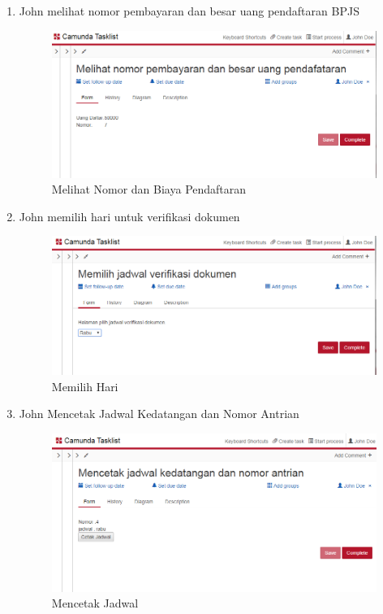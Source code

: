 \begin{enumerate}
	\item John melihat nomor pembayaran dan besar uang pendaftaran BPJS
	\begin{figure}[H]
			\centering
			\includegraphics[scale=0.6]{Gambar/Bab-3/BPMS/Kasus2/3}
			\caption{Melihat Nomor dan Biaya Pendaftaran} 
			\label{fig:otomasi_kasus2_3}
	\end{figure}
	
	\item John memilih hari untuk verifikasi dokumen
	\begin{figure}[H]
			\centering
			\includegraphics[scale=0.6]{Gambar/Bab-3/BPMS/Kasus2/4}
			\caption{Memilih Hari} 
			\label{fig:otomasi_kasus2_4}
	\end{figure}
	
	\item John Mencetak Jadwal Kedatangan dan Nomor Antrian
	\begin{figure}[H]
			\centering
			\includegraphics[scale=0.6]{Gambar/Bab-3/BPMS/Kasus2/5}
			\caption{Mencetak Jadwal} 
			\label{fig:otomasi_kasus2_5}
	\end{figure}
	

\end{enumerate}
